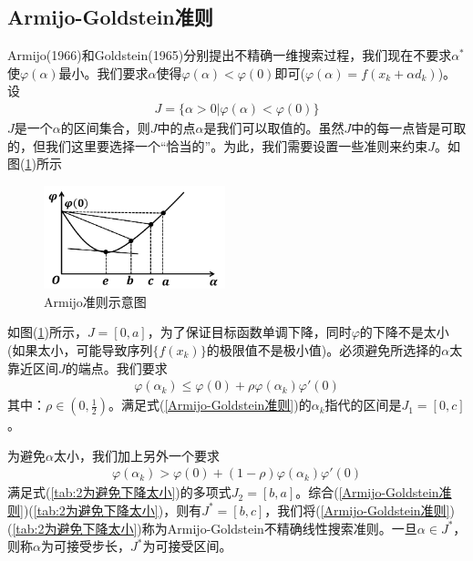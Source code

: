     \subsection{Armijo-Goldstein准则}
        \par
        Armijo(1966)和Goldstein(1965)分别提出不精确一维搜索过程，我们现在不要求${\alpha}^*$使$\varphi(\alpha)$最小。我们要求$\alpha$使得$\varphi(\alpha)<\varphi(0)$即可($\varphi(\alpha)=f(x_k+\alpha d_k)$)。设
                \begin{align*}
                J=\{\alpha > 0 \big|\varphi(\alpha)<\varphi(0)\}
                \end{align*}
        $J$是一个${\alpha}$的区间集合，则$J$中的点${\alpha}$是我们可以取值的。虽然$J$中的每一点皆是可取的，但我们这里要选择一个“恰当的”。为此，我们需要设置一些准则来约束$J$。如图(\ref{fig:Armijo准则示意图})所示
        \begin{figure}[H]
        \centering
        \includegraphics[height=3cm]{images/Armijo.jpg}
        \caption{Armijo准则示意图}
        \label{fig:Armijo准则示意图}
        \end{figure}
        \par
        如图(\ref{fig:Armijo准则示意图})所示，$J=[0,a]$，为了保证目标函数单调下降，同时$\varphi$的下降不是太小(如果太小，可能导致序列$\{f(x_k)\}$的极限值不是极小值)。必须避免所选择的$\alpha$太靠近区间$J$的端点。我们要求
        \begin{align}\label{Armijo-Goldstein准则}
        \varphi({\alpha}_k) \leqslant \varphi(0)+\rho \varphi({\alpha}_k) {\varphi}'(0)
        \end{align}
        其中：$\rho \in (0,\frac 12)$。满足式(\ref{Armijo-Goldstein准则})的${\alpha}_k$指代的区间是$J_1=[0,c]$。
        \par
        为避免$\alpha$太小，我们加上另外一个要求
        \begin{align}\label{tab:2为避免下降太小}
        \varphi({\alpha}_k) > \varphi(0)+(1-\rho) \varphi({\alpha}_k){\varphi}'(0)
        \end{align}
        满足式(\ref{tab:2为避免下降太小})的多项式$J_2=[b,a]$。综合(\ref{Armijo-Goldstein准则})(\ref{tab:2为避免下降太小})，则有$J^*=[b,c]$，我们将(\ref{Armijo-Goldstein准则})(\ref{tab:2为避免下降太小})称为Armijo-Goldstein不精确线性搜索准则。一旦$\alpha \in J^*$，则称$\alpha $为可接受步长，$J^*$为可接受区间。
